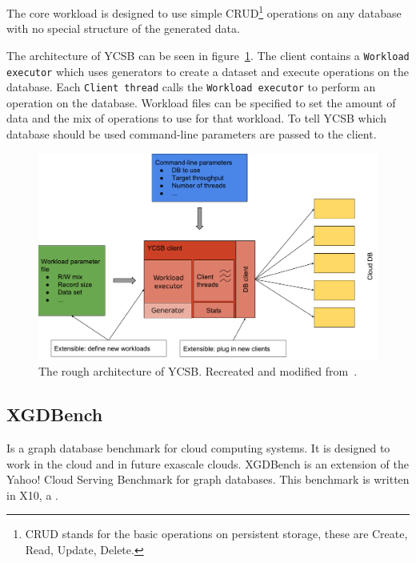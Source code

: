 The core workload is designed to use simple CRUD\footnote{CRUD stands for the basic operations on persistent storage, these are Create, Read, Update, Delete.} operations on any database with no special structure of the generated data.

The architecture of YCSB can be seen in figure~\ref{fig:ycsbArchitecture}.
The client contains a \texttt{Workload executor} which uses generators to create a dataset and execute operations on the database.
Each \texttt{Client thread} calls the \texttt{Workload executor} to perform an operation on the database.
Workload files can be specified to set the amount of data and the mix of operations to use for that workload.
To tell YCSB which database should be used command-line parameters are passed to the client.

\begin{figure}[h!]
  \centering
  \includegraphics[width=\textwidth]{images/benchmarks/ycsbArchitecture}
  \caption{The rough architecture of YCSB. Recreated and modified from~\cite[25]{Abubakar2014}.}
  \label{fig:ycsbArchitecture}
\end{figure}

\subsection{XGDBench}
Is a graph database benchmark for cloud computing systems.
It is designed to work in the cloud and in future exascale clouds.
XGDBench is an extension of the Yahoo! Cloud Serving Benchmark for graph databases.
This benchmark is written in X10,
a .

